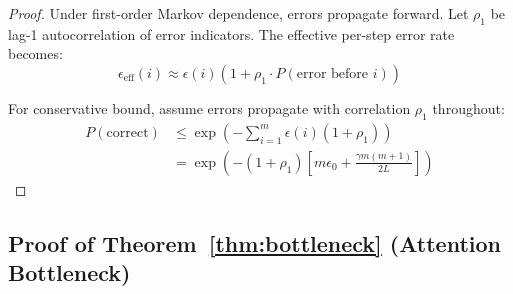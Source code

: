 \documentclass{article}
\theoremstyle{plain}
\theoremstyle{definition}
\theoremstyle{remark}
\begin{document}
\begin{proof}
Under first-order Markov dependence, errors propagate forward. Let $\rho_1$ be lag-1 autocorrelation of error indicators. The effective per-step error rate becomes:
\begin{equation}
\epsilon_{\text{eff}}(i) \approx \epsilon(i)(1 + \rho_1 \cdot P(\text{error before } i))
\end{equation}

For conservative bound, assume errors propagate with correlation $\rho_1$ throughout:
\begin{align}
P(\text{correct}) &\leq \exp\left(-\sum_{i=1}^{m} \epsilon(i)(1 + \rho_1)\right) \\
&= \exp\left(-(1 + \rho_1)\left[m\epsilon_0 + \frac{\gamma m(m+1)}{2L}\right]\right)
\end{align}
\end{proof}

\subsection{Proof of Theorem~\ref{thm:bottleneck} (Attention Bottleneck)}
\label{app:bottleneck_proof}
\end{document}
